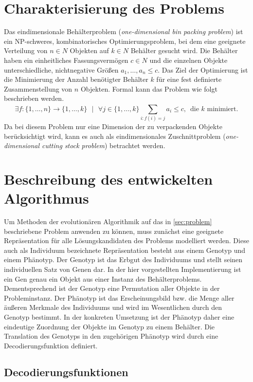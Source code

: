     \section{Charakterisierung des Problems}
    \label{sec:problem}
    Das eindimensionale Behälterproblem (\textit{one-dimensional bin packing problem}) ist ein NP-schweres, kombinatorisches Optimierungsproblem, bei dem eine geeignete Verteilung von $n \in N$ Objekten auf $k \in N$ Behälter gesucht wird. Die Behälter haben ein einheitliches Fassungsvermögen $c \in N$ und die einzelnen Objekte unterschiedliche, nichtnegative Größen $a_1, \dots ,a_n \le c$. Das Ziel der Optimierung ist die Minimierung der Anzahl benötigter Behälter $k$ für eine fest definierte Zusammenstellung von $n$ Objekten. Formal kann das Problem wie folgt beschrieben werden.
    $$\exists f: \{1,\dots,n\} \rightarrow \{1,\dots,k\} \text{ } | \text{ } \forall j \in \{1,\dots,k\} \displaystyle\sum\limits_{i:f(i) = j}^{}{a_i \le c} \text{, }  \text{ die }k\text{ minimiert.}$$
Da bei diesem Problem nur eine Dimension der zu verpackenden Objekte berücksichtigt wird, kann es auch als eindimensionales Zuschnittproblem (\textit{one-dimensional cutting stock problem}) betrachtet werden. \parencite[485]{KorteVygen:2008}
    
    \section{Beschreibung des entwickelten Algorithmus}

    Um Methoden der evolutionären Algorithmik auf das in \autoref{sec:problem} beschriebene Problem anwenden zu können, muss zunächst eine geeignete Repräsentation für alle Lösungskandidaten des Problems modelliert werden. Diese auch als Individuum bezeichnete Repräsentation besteht aus einem Genotyp und einem Phänotyp. Der Genotyp ist das Erbgut des Individuums und stellt seinen individuellen Satz von Genen dar. In der hier vorgestellten Implementierung ist ein Gen genau ein Objekt aus einer Instanz des Behälterproblems. Dementsprechend ist der Genotyp eine Permutation aller Objekte in der Probleminstanz. Der Phänotyp ist das Erscheinungsbild bzw. die Menge aller äußeren Merkmale des Individuums und wird im Wesentlichen durch den Genotyp bestimmt. In der konkreten Umsetzung ist der Phänotyp daher eine eindeutige Zuordnung der Objekte im Genotyp zu einem Behälter. Die Translation des Genotyps in den zugehörigen Phänotyp wird durch eine Decodierungsfunktion definiert. 
    
    \subsection{Decodierungsfunktionen}    

